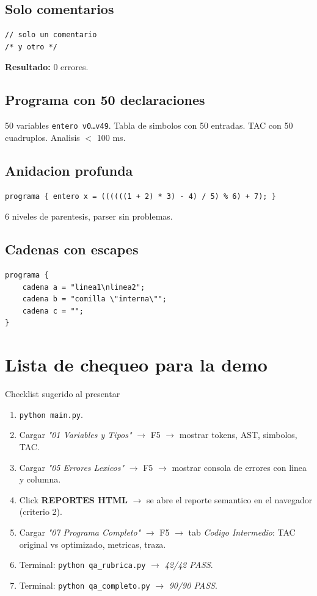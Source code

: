 \documentclass[11pt,a4paper]{article}
\begin{document}
\subsection{Solo comentarios}
\begin{lstlisting}[style=ml]
// solo un comentario
/* y otro */
\end{lstlisting}
\textbf{Resultado:} 0 errores.

\subsection{Programa con 50 declaraciones}
50 variables \texttt{entero v0\dots v49}. Tabla de simbolos con 50
entradas. TAC con 50 cuadruplos. Analisis $<$ 100 ms.

\subsection{Anidacion profunda}
\begin{lstlisting}[style=ml]
programa { entero x = ((((((1 + 2) * 3) - 4) / 5) % 6) + 7); }
\end{lstlisting}
6 niveles de parentesis, parser sin problemas.

\subsection{Cadenas con escapes}
\begin{lstlisting}[style=ml]
programa {
    cadena a = "linea1\nlinea2";
    cadena b = "comilla \"interna\"";
    cadena c = "";
}
\end{lstlisting}

\section{Lista de chequeo para la demo}

\begin{caja}{Checklist sugerido al presentar}
\begin{enumerate}[leftmargin=*,nosep]
  \item \texttt{python main.py}.
  \item Cargar \emph{"01 Variables y Tipos"} $\rightarrow$ F5
        $\rightarrow$ mostrar tokens, AST, simbolos, TAC.
  \item Cargar \emph{"05 Errores Lexicos"} $\rightarrow$ F5
        $\rightarrow$ mostrar consola de errores con linea y columna.
  \item Click \textbf{REPORTES HTML} $\rightarrow$ se abre el reporte
        semantico en el navegador (criterio 2).
  \item Cargar \emph{"07 Programa Completo"} $\rightarrow$ F5
        $\rightarrow$ tab \emph{Codigo Intermedio}: TAC original vs
        optimizado, metricas, traza.
  \item Terminal: \texttt{python qa\_rubrica.py} $\rightarrow$
        \emph{42/42 PASS}.
  \item Terminal: \texttt{python qa\_completo.py} $\rightarrow$
        \emph{90/90 PASS}.
\end{enumerate}
\end{caja}
\end{document}
